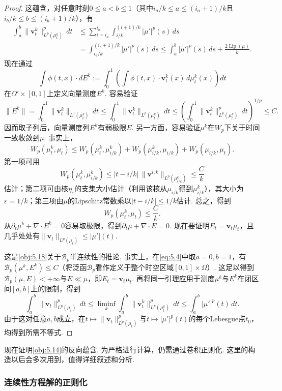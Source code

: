 \begin{proof}
这蕴含，对任意时刻$0\le a<b\le1$（其中$i_a/k\le a\le(i_a+1)/k$且$i_b/k\le b\le(i_b+1)/k$），有
\begin{equation}\label{eq:5.4}
\begin{aligned}
\int_a^b\|\mathbf v_t^k\|_{L^p(\mu_t^k)}^p\,dt
&\le\sum_{i=i_a}^{i_b}\int_{i/k}^{(i+1)/k}|\mu'|^p(s)\,ds\\
&=\int_{i_a/k}^{(i_b+1)/k}|\mu'|^p(s)\,ds
\le\int_a^b|\mu'|^p(s)\,ds+\frac{2\operatorname{Lip}(\mu)}k.
\end{aligned}
\end{equation}
现在通过
\[
\int\phi(t,x)\cdot dE^k:=\int_0^1\left(\int\phi(t,x)\cdot\mathbf v_t^k(x)\,d\mu_t^k(x)\right)dt
\]
在$\Omega'\times[0,1]$上定义向量测度$E^k$. 容易验证
\[
\|E^k\|=\int_0^1\|\mathbf v_t^k\|_{L^1(\mu_t^k)}\,dt
\le\int_0^1\|\mathbf v_t^k\|_{L^p(\mu_t^k)}\,dt
\le\left(\int_0^1\|\mathbf v_t^k\|_{L^p(\mu_t^k)}^p\,dt\right)^{1/p}\le C.
\]
因而取子列后，向量测度列$E^k$有弱极限$E$. 另一方面，容易验证$\mu^k$在$W_p$下关于时间一致收敛到$\mu$. 事实上，
\[
W_p(\mu_t^k,\mu_t)
\le W_p(\mu_t^k,\mu_{i/k}^k)+W_p(\mu_{i/k}^k,\mu_{i/k})+W_p(\mu_{i/k},\mu_t).
\]
第一项可用
\[
W_p(\mu_t^k,\mu_{i/k}^k)\le|t-i/k|\,\|\mathbf v^{i,k}\|_{L^p(\mu_{i/k}^k)}\le\frac Ck
\]
估计；第二项可由核$\eta_\varepsilon$的支集大小估计（利用该核从$\mu_{i/k}$得到$\mu_{i/k}^k$），其大小为$\varepsilon=1/k$；第三项由$\mu$的Lipschitz常数乘以$|t-i/k|\le1/k$估计. 总之，得到
\[
W_p(\mu_t^k,\mu_t)\le\frac Ck.
\]
从$\partial_t\mu^k+\nabla\cdot E^k=0$容易取极限，得到$\partial_t\mu+\nabla\cdot E=0$. 现在要证明$E_t=\mathbf v_t\mu_t$，且几乎处处有$\|\mathbf v_t\|_{L^p(\mu_t)}\le|\mu'|(t)$.

这是\autoref{obj:5.18}关于$\mathscr B_p$半连续性的推论. 事实上，在\eqref{eq:5.4}中取$a=0,b=1$，有$\mathscr B_p(\mu^k,E^k)\le C$（将泛函$\mathscr B_p$看作定义于整个时空区域$[0,1]\times\Omega$）. 这足以得到$\mathscr B_p(\mu,E)<+\infty$与$E\ll\mu$，即$E_t=\mathbf v_t\mu_t$. 再将同一引理应用于测度$\mu^k$与$E^k$在闭区间$[a,b]$上的限制，得到
\[
\int_a^b\|\mathbf v_t\|_{L^p(\mu_t)}^p\,dt
\le\liminf_k\int_a^b\|\mathbf v_t^k\|_{L^p(\mu_t^k)}^p\,dt
\le\int_a^b|\mu'|^p(t)\,dt.
\]
由于这对任意$a,b$成立，在$t\mapsto\|\mathbf v_t\|_{L^p(\mu_t)}^p$与$t\mapsto|\mu'|^p(t)$的每个Lebesgue点$t_0$，均得到所需不等式.
\end{proof}

现在证明\autoref{obj:5.14}的反向蕴含. 为严格进行计算，仍需通过卷积正则化. 这里的构造以后会多次用到，值得详细叙述和分析.

\subsubsection{连续性方程解的正则化}\label{sec:5.3.3}

